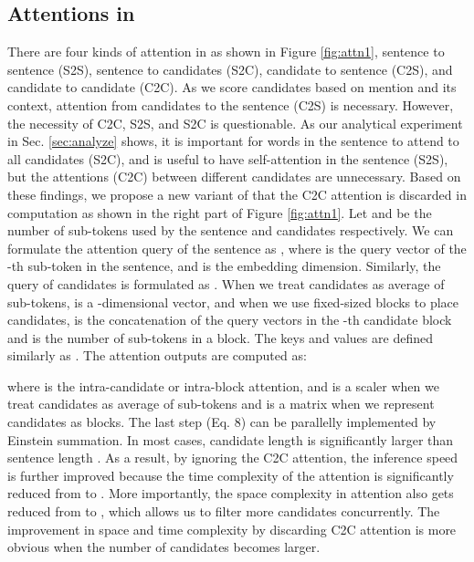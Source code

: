 \documentclass[11pt]{article}
\begin{document}
\subsection{Attentions in \name}
\label{sec:attn}
There are four kinds of attention in {\bf \textsc{\name}} as shown in Figure \ref{fig:attn1}, sentence to sentence (S2S), sentence to candidates (S2C), candidate to sentence (C2S), and candidate to candidate (C2C). As we score candidates based on mention and its context, attention from candidates to the sentence (C2S) is necessary. However, the necessity of C2C, S2S, and S2C is questionable. As our analytical experiment in Sec. \ref{sec:analyze} shows, it is important for words in the sentence to attend to all candidates (S2C), and is useful to have self-attention in the sentence (S2S), but the attentions (C2C) between different candidates are unnecessary. Based on these findings, we propose a new variant of {\bf \textsc{\name}} that the C2C attention is discarded in computation as shown in the right part of Figure \ref{fig:attn1}. Let  and  be the number of sub-tokens used by the sentence and candidates respectively. We can formulate the attention query of the sentence as ,  where  is the query vector of the -th sub-token in the sentence, and  is the embedding dimension. Similarly, the query of candidates is formulated as . When we treat candidates as average of sub-tokens,  is a -dimensional vector, and when we use fixed-sized blocks to place candidates,  is the concatenation of the query vectors in the -th candidate block and  is the number of sub-tokens in a block. The keys and values are defined similarly as . The attention outputs are computed as:

where  is the intra-candidate or intra-block attention, and  is a scaler when we treat candidates as average of sub-tokens and is a  matrix when we represent candidates as blocks. The last step (Eq. 8) can be parallelly implemented by Einstein summation.
In most cases, candidate length  is significantly larger than sentence length . As a result, by ignoring the C2C attention, the inference speed is further improved because the time complexity of the attention is significantly reduced from  to . More importantly, the space complexity in attention also gets reduced from  to , which allows us to filter more candidates concurrently. The improvement in space and time complexity by discarding C2C attention is more obvious when the number of candidates becomes larger.
\end{document}
